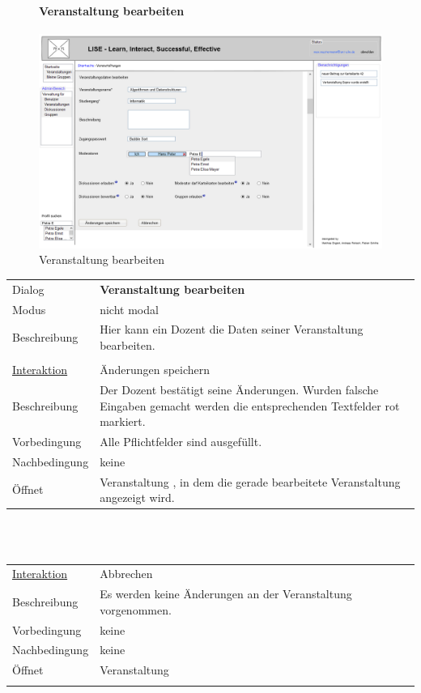 \documentclass[12pt,a4paper]{article}
\begin{document}
{\begin{figure}[H]
	\paragraph{Veranstaltung bearbeiten}
	\includegraphics[width=\textwidth]{Bilder/Mockups/GUI/VeranstaltungBearbeiten.png}
	\caption{Veranstaltung bearbeiten}
	\label{VeranstaltungBearbeiten}
\end{figure}

\begin{tabular}{l p{12cm}}
Dialog 	 & \textbf{Veranstaltung bearbeiten} \\ 
Modus & nicht modal\\ 
Beschreibung   	 & Hier kann ein Dozent die Daten seiner Veranstaltung bearbeiten. \\\\

\underline{Interaktion}  	 & Änderungen speichern\\ 
Beschreibung   	 & Der Dozent bestätigt seine Änderungen. Wurden falsche Eingaben gemacht werden die entsprechenden Textfelder rot markiert. \\
Vorbedingung   	 & Alle Pflichtfelder sind ausgefüllt.\\
Nachbedingung	 & keine\\
Öffnet			 & \glqq Veranstaltung \grqq, in dem die gerade bearbeitete Veranstaltung angezeigt wird. \\
\end{tabular}\\\\

\begin{tabular}{l p{12cm}}
\underline{Interaktion}  	 & Abbrechen\\ 
Beschreibung   	 & Es werden keine Änderungen an der Veranstaltung vorgenommen.  \\
Vorbedingung	 & keine \\
Nachbedingung	 & keine \\
Öffnet			 & \glqq Veranstaltung\grqq \\\\
\end{tabular}\\\\

}
\end{document}
